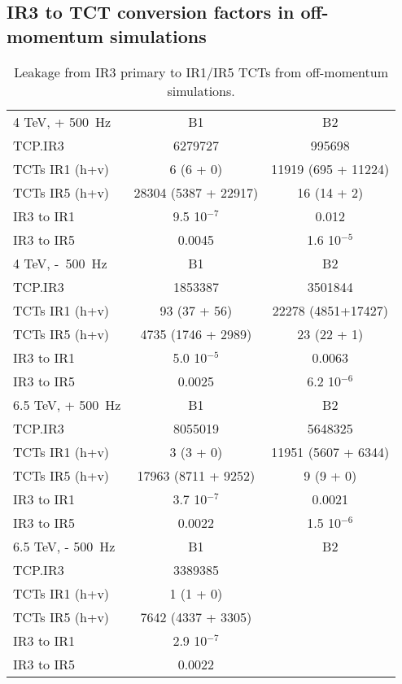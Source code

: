 \subsection{IR3 to TCT conversion factors in off-momentum simulations}
\begin{table}[!h]
   \centering
   \caption{Leakage from IR3 primary to IR1/IR5 TCTs from off-momentum simulations.}

   \begin{tabular}{l|c|c}
       \hline
       4 TeV, + 500~Hz  & B1 & B2\\
       TCP.IR3  & 6279727 & 995698  \\
       TCTs IR1 (h+v) & 6 (6 + 0) & 11919 (695 + 11224) \\
       TCTs IR5 (h+v) & 28304 (5387 + 22917) & 16 (14 + 2) \\
       IR3 to IR1 & 9.5 10$^{-7}$ & 0.012 \\
       IR3 to IR5 & 0.0045 & 1.6 10$^{-5}$ \\
       \hline
       4 TeV, -~500~Hz  & B1 & B2\\
       TCP.IR3  & 1853387 & 3501844 \\
       TCTs IR1 (h+v) & 93 (37 + 56) & 22278 (4851+17427) \\
       TCTs IR5 (h+v) &  4735 (1746 + 2989) & 23 (22 + 1) \\
       IR3 to IR1 & 5.0 10$^{-5}$ & 0.0063 \\
       IR3 to IR5 & 0.0025 & 6.2 10$^{-6}$ \\
       \hline

       6.5 TeV, + 500~Hz  & B1 & B2\\
       TCP.IR3  & 8055019 & 5648325  \\
       TCTs IR1 (h+v) & 3 (3 + 0) & 11951 (5607 + 6344) \\
       TCTs IR5 (h+v) & 17963 (8711 + 9252) & 9 (9 + 0)\\
       IR3 to IR1 & 3.7 10$^{-7}$ & 0.0021 \\
       IR3 to IR5 & 0.0022 & 1.5 10$^{-6}$ \\
       \hline
       6.5 TeV, - 500~Hz  & B1 & B2\\
       TCP.IR3  &  3389385 &   \\
       TCTs IR1 (h+v) &  1 (1 + 0) &   \\
       TCTs IR5 (h+v) &  7642 (4337 + 3305) &  \\
       IR3 to IR1 &  2.9 10$^{-7}$ &  \\
       IR3 to IR5 &  0.0022 &   \\
       \hline

   \end{tabular}
   \label{tab:IR3leakageFactors}
\end{table}

